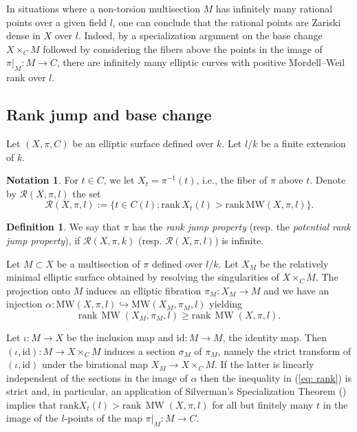 \documentclass{amsart}
\theoremstyle{definition}
\newtheorem{definition}[theorem]{Definition}
\newtheorem{notation}[theorem]{Notation}
\numberwithin{equation}{section}
\DeclareMathOperator{\MW}{MW}
\begin{document}
In situations where a non-torsion multisection $M$ has infinitely many rational points over a given field $l$, one can conclude that the rational points are Zariski dense in $X$ over $l$.  Indeed, by a specialization argument on the base change $X\times_C M$ followed by considering the fibers above the points in the image of $\pi|_M: M \rightarrow C$, there are infinitely many elliptic curves with positive Mordell--Weil rank over $l$. 

\subsection{Rank jump and base change}\label{subsection: base change}
Let $(X,\pi, C)$ be an elliptic surface defined over $k$. Let $l/k$ be a finite extension of $k$.

\begin{notation}
 For $t\in C$, we let $X_t=\pi^{-1}(t)$, i.e., the fiber of $\pi$ above $t$.  Denote by $\mathcal{R}(X,\pi, l)$ the set 
\[
\mathcal{R}(X,\pi, l):= \{t \in C(l); \mathrm{rank } \,X_t(l) > \mathrm{rank }\, \mathrm{MW }(X, \pi,l) \}.
\]
\end{notation}

\begin{definition}
We say that $\pi$ has the \textit{rank jump property} (resp. the \textit{potential rank jump property}), if $\mathcal{R}(X,\pi, k)$ (resp. $\mathcal{R}(X,\pi, l)$) is infinite. 
\end{definition}
Let $M \subset X$ be a multisection of $\pi$ defined over $l/k$. Let $X_M$ be the relatively minimal elliptic surface obtained by resolving the singularities of $X\times_C M$. The projection onto $M$ induces an elliptic fibration $\pi_M: X_M \rightarrow M$ and we have an injection  $\alpha: \mathrm{MW }(X, \pi,l) \hookrightarrow \mathrm{MW }(X_M,\pi_M,l)$ yielding
\begin{equation}\label{eq: rank}
\mathrm{rank}\, \MW(X_M,\pi_M,l)\geq \mathrm{rank}\, \MW(X,\pi,l).
\end{equation}

Let $\iota:M\rightarrow X$ be the inclusion map and $\mathrm{id: } M \rightarrow M$, the identity map. Then $(\iota, \mathrm{id}):M \rightarrow X \times_C M$ induces a section $\sigma_M$ of $\pi_M$, namely the strict transform of $(\iota, \mathrm{id})$ under the birational map $X_M\rightarrow X \times_{C} M$. If the latter is linearly independent of the sections in the image of $\alpha$ then the inequality in (\ref{eq: rank}) is strict and, in particular, an application of Silverman's Specialization Theorem (\cite[Theorem C]{Silverman}) implies that  $\mathrm{rank}X_t(l)> \mathrm{rank}\, \MW(X,\pi,l)$ for all but finitely many $t$ in the image of the $l$-points of the map $\pi|_M: M \rightarrow C$. 
\end{document}
